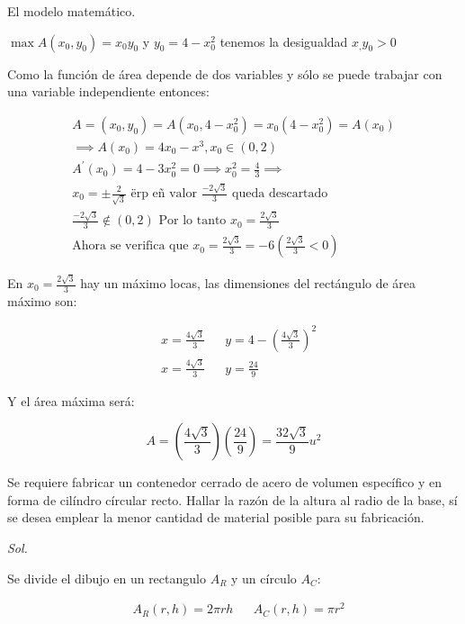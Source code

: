 El modelo matemático.

$\max A(x_0,y_0)=x_0y_0$ y $y_0=4-x_0^2$ tenemos la desigualdad $x_,y_0>0$

Como la función de área depende de dos variables y sólo se puede trabajar con una variable independiente
entonces:

\begin{align*}
	A=(x_0,y_0)=A(x_0,4-x^2_0)=x_0(4-x^2_0)=A(x_0)                                                 \\
	\implies A(x_0)=4x_0-x^3, x_0 \in (0,2)                                                        \\
	A^{\prime}(x_0)=4-3x_0^2=0\implies x_0^2=\frac{4}{3}\implies                                   \\
	x_0=\pm \frac{2}{\sqrt{3}} \text{ ërp eñ valor }\frac{-2\sqrt{3}}{3} \text{ queda descartado } \\
	\frac{-2\sqrt{3}}{3}\notin (0,2) \text{ Por lo tanto } x_0=\frac{2\sqrt{3}}{3}                 \\
	\text{Ahora se verifica que }x_0=\frac{2\sqrt{3}}{3}=-6\left(\frac{2\sqrt{3}}{3}<0\right)
\end{align*}

En $x_0=\frac{2\sqrt{3}}{3}$ hay un máximo locas, las dimensiones del rectángulo de área máximo son:

\begin{align*}
	 & x=\frac{4\sqrt{3}}{3} &  & y=4-\left(\frac{4\sqrt{3}}{3}\right)^2 \\
	 & x=\frac{4\sqrt{3}}{3} &  & y=\frac{24}{9}
\end{align*}

Y el área máxima será:

\begin{equation*}
	A=\left(\frac{4\sqrt{3}}{3}\right)\left(\frac{24}{9}\right)=\frac{32\sqrt{3}}{9}u^2
\end{equation*}

\begin{example}
	Se requiere fabricar un contenedor cerrado de acero de volumen específico y en forma de cilíndro círcular recto.
	Hallar la razón de la altura al radio de la base, sí se desea emplear la menor cantidad de material posible para su fabricación.
\end{example}

\textit{ Sol. }

Se divide el dibujo en un rectangulo $A_R$ y un círculo $A_C$:

\begin{align*}
	 & A_R(r,h)=2\pi rh &  & A_C(r,h)=\pi r^2
\end{align*}

